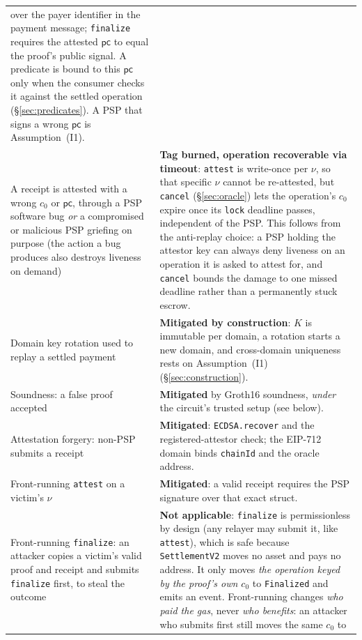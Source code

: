 \documentclass[11pt]{article}
\newcommand{\code}[1]{\texttt{#1}}
\begin{document}
{\begin{longtable}{@{}p{}p{}@{}}
over the payer identifier in the payment message; \code{finalize} requires the
attested $\mathsf{pc}$ to equal the proof's public signal. A predicate is bound
to this $\mathsf{pc}$ only when the consumer checks it against the settled
operation (\S\ref{sec:predicates}). A PSP that signs a wrong $\mathsf{pc}$ is
Assumption~(I1). \\[2pt]
A receipt is attested with a wrong $c_0$ or $\mathsf{pc}$, through a PSP
software bug \emph{or} a compromised or malicious PSP griefing on purpose (the
action a bug produces also destroys liveness on demand)
& \textbf{Tag burned, operation recoverable via timeout}: \code{attest} is
write-once per $\nu$, so that specific $\nu$ cannot be re-attested, but
\code{cancel} (\S\ref{sec:oracle}) lets the operation's $c_0$ expire once its
\code{lock} deadline passes, independent of the PSP. This follows from the
anti-replay choice: a PSP holding the attestor key can always deny liveness on
an operation it is asked to attest for, and \code{cancel} bounds the damage to
one missed deadline rather than a permanently stuck escrow. \\[2pt]
Domain key rotation used to replay a settled payment
& \textbf{Mitigated by construction}: $K$ is immutable per domain, a rotation
starts a new domain, and cross-domain uniqueness rests on Assumption~(I1)
(\S\ref{sec:construction}). \\[2pt]
Soundness: a false proof accepted
& \textbf{Mitigated} by Groth16 soundness, \emph{under} the circuit's trusted
setup (see below). \\[2pt]
Attestation forgery: non-PSP submits a receipt
& \textbf{Mitigated}: \code{ECDSA.recover} and the registered-attestor check;
the EIP-712 domain binds \code{chainId} and the oracle address. \\[2pt]
Front-running \code{attest} on a victim's $\nu$
& \textbf{Mitigated}: a valid receipt requires the PSP signature over that
exact struct. \\[2pt]
Front-running \code{finalize}: an attacker copies a victim's valid proof and
receipt and submits \code{finalize} first, to steal the outcome
& \textbf{Not applicable}: \code{finalize} is permissionless by design (any
relayer may submit it, like \code{attest}), which is safe because
\code{SettlementV2} moves no asset and pays no address. It only moves
\emph{the operation keyed by the proof's own $c_0$} to \code{Finalized} and
emits an event. Front-running changes \emph{who paid the gas}, never \emph{who
benefits}: an attacker who submits first still moves the same $c_0$ to

\end{longtable}}
\end{document}
